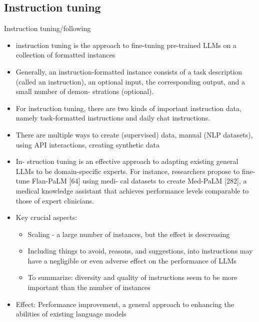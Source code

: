\documentclass[10pt]{beamer}
\begin{document}
\subsection{Instruction tuning}

\begin{frame}{Instruction tuning/following}

\begin{itemize}
\item instruction tuning is the approach to fine-tuning pre-trained LLMs on a collection of formatted instances
\item Generally, an instruction-formatted instance consists of a task description (called an instruction), an optional input, the corresponding output, and a small number of demon- strations (optional).
\item For instruction tuning, there are two kinds of important instruction data, namely task-formatted instructions and daily chat instructions.
\item There are multiple ways to create (supervised) data, manual (NLP datasets), using API interactions, creating synthetic data
\item In- struction tuning is an effective approach to adapting existing general LLMs to be domain-specific experts. For instance, researchers propose to fine-tune Flan-PaLM [64] using medi- cal datasets to create Med-PaLM [282], a medical knowledge assistant that achieves performance levels comparable to those of expert clinicians.
\item Key crucial aspects:
\begin{itemize}
\item Scaling - a large number of instances, but the effect is descreasing
\item Including things to avoid, reasons, and suggestions, into instructions may have a negligible or even adverse effect on the performance of LLMs
\item To summarize: diversity and quality of instructions seem to be more important than the number of instances
\end{itemize}
\item Effect: Performance improvement, a general approach to enhancing the abilities of existing language models
\end{itemize}

\end{frame}
\end{document}
